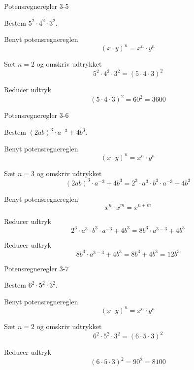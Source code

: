 \documentclass{article}
\begin{document}
\newpage

\begin{exercise}{Potensregneregler 3-5}

Bestem $5^2 \cdot 4^2 \cdot 3^2$.


\hint

Benyt potensregnereglen
\[
(x \cdot y)^n = x^n \cdot y^n
\]

\hint

Sæt $n=2$ og omskriv udtrykket
\[
5^2 \cdot 4^2 \cdot 3^2 = \left(5 \cdot 4 \cdot 3 \right)^2
\]

\hint

Reducer udtryk
\[
\left(5 \cdot 4 \cdot 3 \right)^2 = 60^2 = 3600
\]


\end{exercise}

\newpage

\begin{exercise}{Potensregneregler 3-6}

Bestem $(2ab)^3 \cdot a^{-3}+4b^3$.


\hint

Benyt potensregnereglen
\[
(x \cdot y)^n = x^n \cdot y^n
\]

\hint

Sæt $n=3$ og omskriv udtrykket
\[
(2ab)^3 \cdot a^{-3}+4b^3 = 2^3 \cdot a^3 \cdot b^3 \cdot a^{-3}+4b^3
\]


\hint

Benyt potensregnereglen
\[
x^n \cdot x^m = x^{n + m}
\]

\hint

Reducer udtryk
\[
2^3 \cdot a^3 \cdot b^3 \cdot a^{-3}+4b^3 = 8 b^3 \cdot a^{3 - 3} + 4b^3
\]

\hint

Reducer udtryk
\[
8 b^3 \cdot a^{3 - 3} + 4b^3 = 8 b^3 + 4b^3 = 12b^3
\]



\end{exercise}

\newpage

\begin{exercise}{Potensregneregler 3-7}

Bestem $6^2 \cdot 5^2 \cdot 3^2$.


\hint

Benyt potensregnereglen
\[
(x \cdot y)^n = x^n \cdot y^n
\]

\hint

Sæt $n=2$ og omskriv udtrykket
\[
6^2 \cdot 5^2 \cdot 3^2 = (6 \cdot 5 \cdot 3)^2
\]

\hint

Reducer udtryk
\[
(6 \cdot 5 \cdot 3)^2 = 90^2 = 8100
\]


\end{exercise}
\end{document}
